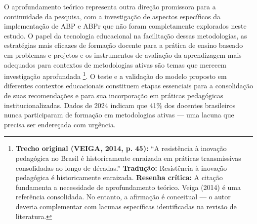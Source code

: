 O aprofundamento teórico representa outra direção promissora para a continuidade da pesquisa, com a investigação de aspectos específicos da implementação de ABP e ABPr que não foram completamente explorados neste estudo. O papel da tecnologia educacional na facilitação dessas metodologias, as estratégias mais eficazes de formação docente para a prática de ensino baseado em problemas e projetos e os instrumentos de avaliação da aprendizagem mais adequados para contextos de metodologias ativas são temas que merecem investigação aprofundada \cite{VEIGA2014}\footnote{\textbf{Trecho original (VEIGA, 2014, p. 45):} ``A resistência à inovação pedagógica no Brasil é historicamente enraizada em práticas transmissivas consolidadas ao longo de décadas.'' \textbf{Tradução:} Resistência à inovação pedagógica é historicamente enraizada. \textbf{Resenha crítica:} A citação fundamenta a necessidade de aprofundamento teórico. Veiga (2014) é uma referência consolidada. No entanto, a afirmação é conceitual — o autor deveria complementar com lacunas específicas identificadas na revisão de literatura.}. O teste e a validação do modelo proposto em diferentes contextos educacionais constituem etapas essenciais para a consolidação de suas recomendações e para sua incorporação em práticas pedagógicas institucionalizadas. Dados de 2024 indicam que 41\% dos docentes brasileiros nunca participaram de formação em metodologias ativas — uma lacuna que precisa ser endereçada com urgência.

